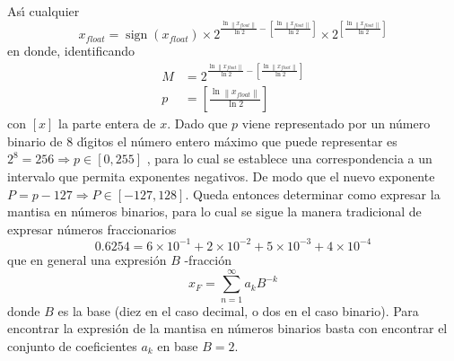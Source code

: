\documentclass[spanish,titlepage,11pt]{article}
\begin{document}
As\'{\i} cualquier
\begin{equation}
x_{float}=\operatorname*{sign}\left(  x_{float}\right)  \times2^{\frac
{\ln\left\|  x_{float}\right\|  }{\ln2}-\left[  \frac{\ln\left\|
x_{float}\right\|  }{\ln2}\right]  }\times2^{\left[  \frac{\ln\left\|
x_{float}\right\|  }{\ln2}\right]  }%
\end{equation}
en donde, identificando
\begin{align}
M  &  =2^{\frac{\ln\left\|  x_{float}\right\|  }{\ln2}-\left[  \frac
{\ln\left\|  x_{float}\right\|  }{\ln2}\right]  }\\
p  &  =\left[  \frac{\ln\left\|  x_{float}\right\|  }{\ln2}\right]
\end{align}
con $\left[  x\right]  $ la parte entera de $x.$ Dado que $p$ viene
representado por un n\'{u}mero binario de 8 d\'{\i}gitos el n\'{u}mero entero
m\'{a}ximo que puede representar es $2^{8}=256\Longrightarrow p\in\left[
0,255\right]  $ , para lo cual se establece una correspondencia a un intervalo
que permita exponentes negativos. De modo que el nuevo exponente
$P=p-127\Longrightarrow P\in\left[  -127,128\right]  .$ Queda entonces
determinar como expresar la mantisa en n\'{u}meros binarios, para lo cual se
sigue la manera tradicional de expresar n\'{u}meros fraccionarios
\begin{equation}
0.6254=6\times10^{-1}+2\times10^{-2}+5\times10^{-3}+4\times10^{-4}%
\end{equation}
que en general una expresi\'{o}n $B$ -fracci\'{o}n
\begin{equation}
x_{F}=\sum_{n=1}^{\infty}a_{k}B^{-k}%
\end{equation}
donde $B$ es la base (diez en el caso decimal, o dos en el caso binario). Para
encontrar la expresi\'{o}n de la mantisa en n\'{u}meros binarios basta con
encontrar el conjunto de coeficientes $a_{k}$ en base $B=2.$ \pagebreak 
\end{document}
